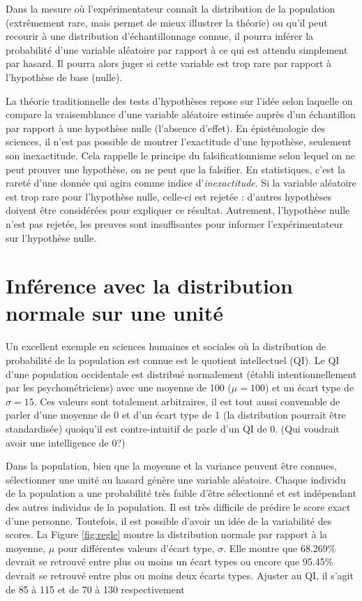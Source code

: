 \documentclass[
]{book}
\begin{document}
Dans la mesure où l'expérimentateur connaît la distribution de la population (extrêmement rare, mais permet de mieux illustrer la théorie) ou qu'il peut recourir à une distribution d'échantillonnage connue, il pourra inférer la probabilité d'une variable aléatoire par rapport à ce qui est attendu simplement par hasard. Il pourra alors juger si cette variable est trop rare par rapport à l'hypothèse de base (nulle).

La théorie traditionnelle des tests d'hypothèses repose sur l'idée selon laquelle on compare la vraisemblance d'une variable aléatoire estimée auprès d'un échantillon par rapport à une hypothèse nulle (l'absence d'effet). En épistémologie des sciences, il n'est pas possible de montrer l'exactitude d'une hypothèse, seulement son inexactitude. Cela rappelle le principe du falsificationnisme selon lequel on ne peut prouver une hypothèse, on ne peut que la falsifier. En statistiques, c'est la rareté d'une donnée qui agira comme indice d'\emph{inexactitude}. Si la variable aléatoire est trop rare pour l'hypothèse nulle, celle-ci est rejetée : d'autres hypothèses doivent être considérées pour expliquer ce résultat. Autrement, l'hypothèse nulle n'est pas rejetée, les preuves sont insuffisantes pour informer l'expérimentateur sur l'hypothèse nulle.

\hypertarget{infuxe9rence-avec-la-distribution-normale-sur-une-unituxe9}{%
\section{Inférence avec la distribution normale sur une unité}\label{infuxe9rence-avec-la-distribution-normale-sur-une-unituxe9}}

Un excellent exemple en sciences humaines et sociales où la distribution de probabilité de la population est connue est le quotient intellectuel (QI). Le QI d'une population occidentale est distribué normalement (établi intentionnellement par les psychométriciens) avec une moyenne de 100 (\(\mu=100\)) et un écart type de \(\sigma = 15\). Ces valeurs sont totalement arbitraires, il est tout aussi convenable de parler d'une moyenne de 0 et d'un écart type de 1 (la distribution pourrait être standardisée) quoiqu'il est contre-intuitif de parle d'un QI de 0. (Qui voudrait avoir une intelligence de 0?)

Dans la population, bien que la moyenne et la variance peuvent être connues, sélectionner une unité au hasard génère une variable aléatoire. Chaque individu de la population a une probabilité très faible d'être sélectionné et est indépendant des autres individus de la population. Il est très difficile de prédire le score exact d'une personne. Toutefois, il est possible d'avoir un idée de la variabilité des scores. La Figure \ref{fig:regle} montre la distribution normale par rapport à la moyenne, \(\mu\) pour différentes valeurs d'écart type, \(\sigma\). Elle montre que 68.269\% devrait se retrouvé entre plus ou moins un écart types ou encore que 95.45\% devrait se retrouvé entre plus ou moins deux écarts types. Ajuster au QI, il s'agit de 85 à 115 et de 70 à 130 respectivement
\end{document}
